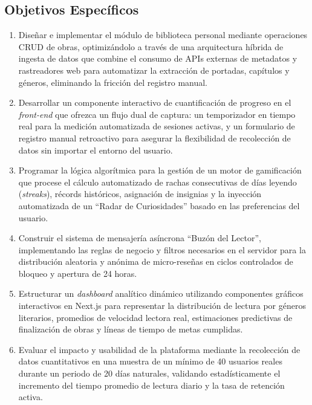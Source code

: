 \documentclass[12pt, atypical, journal]{article}
\begin{document}
\subsection{Objetivos Específicos}
\begin{enumerate}
   \item Diseñar e implementar el módulo de biblioteca personal mediante operaciones CRUD de obras, optimizándolo a través de una arquitectura híbrida de ingesta de datos que combine el consumo de APIs externas de metadatos y rastreadores web para automatizar la extracción de portadas, capítulos y géneros, eliminando la fricción del registro manual.
   \item Desarrollar un componente interactivo de cuantificación de progreso en el \textit{front-end} que ofrezca un flujo dual de captura: un temporizador en tiempo real para la medición automatizada de sesiones activas, y un formulario de registro manual retroactivo para asegurar la flexibilidad de recolección de datos sin importar el entorno del usuario.
   \item Programar la lógica algorítmica para la gestión de un motor de gamificación que procese el cálculo automatizado de rachas consecutivas de días leyendo (\textit{streaks}), récords históricos, asignación de insignias y la inyección automatizada de un ``Radar de Curiosidades'' basado en las preferencias del usuario.
   \item Construir el sistema de mensajería asíncrona ``Buzón del Lector'', implementando las reglas de negocio y filtros necesarios en el servidor para la distribución aleatoria y anónima de micro-reseñas en ciclos controlados de bloqueo y apertura de 24 horas.
   \item Estructurar un \textit{dashboard} analítico dinámico utilizando componentes gráficos interactivos en Next.js para representar la distribución de lectura por géneros literarios, promedios de velocidad lectora real, estimaciones predictivas de finalización de obras y líneas de tiempo de metas cumplidas.
   \item Evaluar el impacto y usabilidad de la plataforma mediante la recolección de datos cuantitativos en una muestra de un mínimo de 40 usuarios reales durante un periodo de 20 días naturales, validando estadísticamente el incremento del tiempo promedio de lectura diario y la tasa de retención activa.
\end{enumerate}

\newpage

\end{document}
